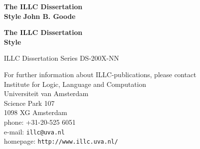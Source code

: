 {\pagestyle{empty}
\newcommand{\printtitle}{%
{\Huge\bfseries The ILLC Dissertation\\[0.8cm] Style}}    %

\begin{titlepage}
\par\vskip 2cm
\begin{center}
\printtitle
\vfill
{\LARGE\bfseries John B. Goode}                           %
\vskip 2cm
\end{center}
\end{titlepage}
%
%
\mbox{}\newpage
\setcounter{page}{1}

\par\vskip 2cm
\begin{center}
\printtitle
\end{center}

\clearpage
\par\vskip 2cm
\begin{center}
ILLC Dissertation Series DS-200X-NN                 %
\par\vspace {2cm}
\illclogo{10cm}
\par\vspace {2cm}
\noindent%
For further information about ILLC-publications, please contact\\[2ex]
Institute for Logic, Language and Computation\\
Universiteit van Amsterdam\\
Science Park 107\\
1098 XG Amsterdam\\
phone: +31-20-525 6051\\
e-mail: {\tt illc@uva.nl}\\
homepage: {\tt http://www.illc.uva.nl/}
\end{center}
\vfill

}

